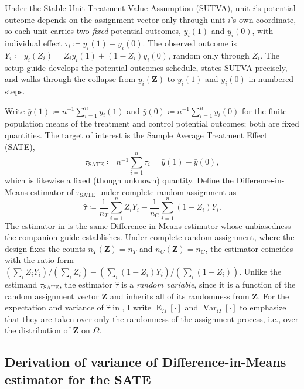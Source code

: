 \documentclass[12pt,leqno]{article}
\theoremstyle{newstyle}
\DeclareMathOperator{\E}{\mathrm{E}}
\DeclareMathOperator{\Var}{\mathrm{Var}}
\newcommand{\bZ}{\bm{Z}}   \newcommand{\bz}{\bm{z}}   %
\newcommand{\EZ}{\E_{\Omega}}    \newcommand{\VarZ}{\Var_{\Omega}}  %
\newcommand{\po}[2]{y_{#1}(#2)}     %
\newcommand{\ybar}[1]{\bar{y}(#1)}  %
\newcommand{\tauS}{\tau_{\text{SATE}}}
\newcommand{\tauhat}{\hat{\tau}}
\begin{document}
Under the Stable Unit Treatment Value Assumption (SUTVA), unit $i$'s potential outcome depends on the assignment vector only through unit $i$'s own coordinate, so each unit carries two \textit{fixed} potential outcomes, $\po{i}{1}$ and $\po{i}{0}$, with individual effect $\tau_i \coloneqq \po{i}{1} - \po{i}{0}$. The observed outcome is $Y_i \coloneqq \po{i}{Z_i} = Z_i \po{i}{1} + (1 - Z_i)\po{i}{0}$, random only through $Z_i$. The setup guide develops the potential outcomes schedule, states SUTVA precisely, and walks through the collapse from $\po{i}{\bZ}$ to $\po{i}{1}$ and $\po{i}{0}$ in numbered steps.

Write $\ybar{1} \coloneqq n^{-1} \sum_{i = 1}^n \po{i}{1}$ and $\ybar{0} \coloneqq n^{-1} \sum_{i = 1}^n \po{i}{0}$ for the finite population means of the treatment and control potential outcomes; both are fixed quantities. The target of interest is the Sample Average Treatment Effect (SATE),
\begin{equation*}
\tauS \coloneqq n^{-1} \sum \limits_{i = 1}^n \tau_i = \ybar{1} - \ybar{0},
\end{equation*}
which is likewise a fixed (though unknown) quantity. Define the Difference-in-Means estimator of $\tauS$ under complete random assignment as
\begin{equation}
\label{eq: diff means est I SATE}
\tauhat \coloneqq \dfrac{1}{n_T} \sum \limits_{i = 1}^n Z_i Y_i - \dfrac{1}{n_C} \sum \limits_{i = 1}^n \left(1 - Z_i\right) Y_i.
\end{equation}
The estimator in  is the same Difference-in-Means estimator whose unbiasedness the companion guide establishes. Under complete random assignment, where the design fixes the counts $n_T(\bZ) = n_T$ and $n_C(\bZ) = n_C$, the estimator coincides with the ratio form $(\sum_i Z_i Y_i) / (\sum_i Z_i) - (\sum_i (1 - Z_i) Y_i) / (\sum_i (1 - Z_i))$. Unlike the estimand $\tauS$, the estimator $\tauhat$ is a \textit{random variable}, since it is a function of the random assignment vector $\bZ$ and inherits all of its randomness from $\bZ$. For the expectation and variance of $\tauhat$ in , I write $\EZ[\cdot]$ and $\VarZ[\cdot]$ to emphasize that they are taken over only the randomness of the assignment process, i.e., over the distribution of $\bZ$ on $\Omega$.

\subsection{Derivation of variance of Difference-in-Means estimator for the SATE}
\end{document}
